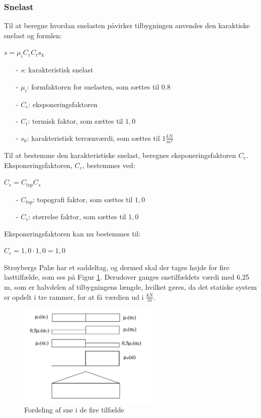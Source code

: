 \subsubsection{Snelast}
Til at beregne hvordan snelasten påvirker tilbygningen anvendes den karaktiske snelast og formlen:
\begin{center}
$s=\mu_iC_eC_ts_k$
\end{center}
\begin{itemize}
	\item[-] $s$: karakteristisk snelast
	\item[-] $\mu_i$: formfaktoren for snelasten, som sættes til 0.8 \citep[ tabel 5.2 kapitel 5.3]{EU91}
	\item[-] $C_e$: eksponeringsfaktoren
	\item[-] $C_t$: termisk faktor, som sættes til $1,\!0$ \citep[ kapitel 5.2]{EU91}
	\item[-] $s_k$: karakteristisk terrænværdi, som sættes til $1 \frac{kN}{m^2}$ \citep[ kapitel 4.1]{EU91}
\end{itemize}
Til at bestemme den karakteristiske snelast, beregnes eksponeringsfaktoren $C_e$.
\newline
\newline
Eksponeringsfaktoren, $C_e$, bestemmes ved:
\begin{center}
$C_e=C_{top}C_s$
\end{center}
\begin{itemize}
	\item[-] $C_{top}$: topografi faktor, som sættes til $1,\!0$ \citep[ tabel 5.1 kapitel 5.2]{EU91}
	\item[-] $C_s$: størrelse faktor, som sættes til $1,\!0$ \citep[ kapitel 5.2]{EU91}
\end{itemize}
Eksponeringsfaktoren kan nu bestemmes til:
\begin{center}
$C_e=1,\!0\cdot 1,\!0=1,\!0$
\end{center}
Strøybergs Palæ har et saddeltag, og dermed skal der tages højde for fire lasttilfælde, som ses på Figur \ref{fig:sne}. Derudover ganges snetilfældets værdi med 6,25 m, som er halvdelen af tilbygningens længde, hvilket gøres, da det statiske system er opdelt i tre rammer, for at få værdien ud i $\frac{kN}{m}$.

\begin{figure}[htbp]
	\centering
	\includegraphics[width=0.6\textwidth]{billeder/snelasttilfaelde.png}
	\caption{Fordeling af sne i de fire tilfælde \citep[ kapitel 5.3.3]{EU91}}
	\label{fig:sne}
\end{figure}

